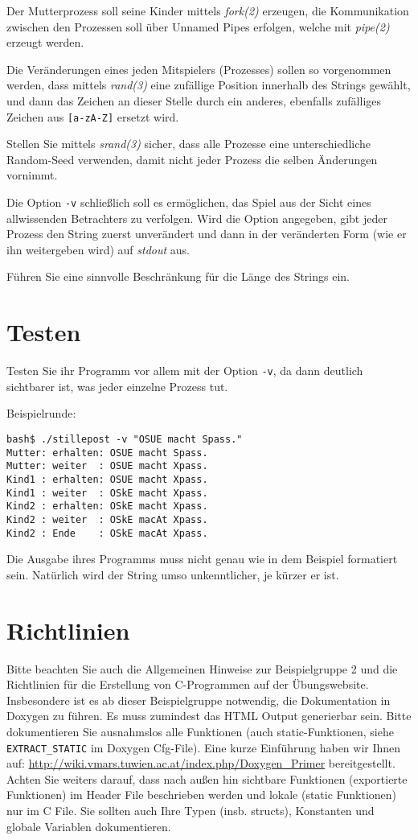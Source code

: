 \documentclass{article}
\begin{document}
Der Mutterprozess soll seine Kinder mittels \emph{fork(2)} erzeugen,
die Kommunikation zwischen den Prozessen soll über Unnamed Pipes
erfolgen, welche mit \emph{pipe(2)} erzeugt werden.

Die Veränderungen eines jeden Mitspielers (Prozesses) sollen so
vorgenommen werden, dass mittels \emph{rand(3)} eine zufällige
Position innerhalb des Strings gewählt, und dann das Zeichen an
dieser Stelle durch ein anderes, ebenfalls zufälliges Zeichen aus
{\tt [a-zA-Z]} ersetzt wird.

Stellen Sie mittels \emph{srand(3)} sicher, dass alle Prozesse eine
unterschiedliche Random-Seed verwenden, damit nicht jeder Prozess die
selben Änderungen vornimmt.

Die Option {\tt -v} schließlich soll es ermöglichen, das Spiel aus
der Sicht eines allwissenden Betrachters zu verfolgen. Wird die Option
angegeben, gibt jeder Prozess den String zuerst unverändert und dann
in der veränderten Form (wie er ihn weitergeben wird) auf
\emph{stdout} aus.

Führen Sie eine sinnvolle Beschränkung für die Länge des Strings
ein.

\section*{Testen}

Testen Sie ihr Programm vor allem mit der Option {\tt -v}, da dann
deutlich sichtbarer ist, was jeder einzelne Prozess tut.

Beispielrunde:
\begin{verbatim}
bash$ ./stillepost -v "OSUE macht Spass."
Mutter: erhalten: OSUE macht Spass.
Mutter: weiter  : OSUE macht Xpass.
Kind1 : erhalten: OSUE macht Xpass.
Kind1 : weiter  : OSkE macht Xpass.
Kind2 : erhalten: OSkE macht Xpass.
Kind2 : weiter  : OSkE macAt Xpass.
Kind2 : Ende    : OSkE macAt Xpass.
\end{verbatim}

Die Ausgabe ihres Programms muss nicht genau wie in dem Beispiel
formatiert sein. Natürlich wird der String umso unkenntlicher, je
kürzer er ist.

\section*{Richtlinien}
Bitte beachten Sie auch die Allgemeinen Hinweise zur Beispielgruppe 2 und die Richtlinien f\"ur die Erstellung von C-Programmen auf der \"Ubungswebsite.
Insbesondere ist es ab dieser Beispielgruppe notwendig, die Dokumentation in Doxygen zu f\"uhren. Es muss zumindest das HTML Output generierbar sein. Bitte dokumentieren Sie ausnahmslos alle Funktionen (auch static-Funktionen, siehe \verb|EXTRACT_STATIC| im Doxygen Cfg-File). Eine kurze Einf\"uhrung haben wir Ihnen auf: \url{http://wiki.vmars.tuwien.ac.at/index.php/Doxygen_Primer} bereitgestellt. Achten Sie weiters darauf, dass nach au{\ss}en hin sichtbare Funktionen (exportierte Funktionen) im Header File beschrieben werden und lokale (static Funktionen) nur im C File. Sie sollten auch Ihre Typen (insb. structs), Konstanten und globale Variablen dokumentieren. 
\end{document}
